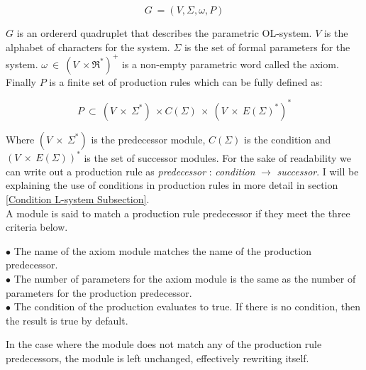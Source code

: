 \begin{flushleft}
\vspace{5mm}

\begin{equation}
G~ = (V, \Sigma, \omega, P)
\end{equation}
\vspace{5mm}

$G$ is an ordererd quadruplet that describes the parametric OL-system. $V$ is the alphabet of characters for the system. $\Sigma$ is the set of formal parameters for the system. $\omega~ \in~ (V~ \times \Re^*)^+$ is a non-empty parametric word called the axiom. Finally $P$ is a finite set of production rules which can be fully defined as:

\vspace{5mm}

\begin{equation}
P~ \subset~ (V~ \times~ \Sigma^*)~ \times C(\Sigma)~ \times~ (V~ \times~ E(\Sigma)^*)^*
\end{equation}

\vspace{5mm} 

Where $(V~ \times~ \Sigma^*) $ is the predecessor module, $C(\Sigma) $ is the condition and $(V~ \times~ E(\Sigma))^* $ is the set of successor modules. For the sake of readability we can write out a production rule as \textit{predecessor} : \textit{condition} $\rightarrow$ \textit{successor}. I will be explaining the use of conditions in production rules in more detail in section \ref{Condition L-system Subsection}.\\
A module is said to match a production rule predecessor if they meet the three criteria below.

\vspace{5mm}

$\bullet$ The name of the axiom module matches the name of the production predecessor. \\
$\bullet$ The number of parameters for the axiom module is the same as the number of parameters for the production predecessor. \\
$\bullet$ The condition of the production evaluates to true. If there is no condition, then the result is true by default.\\

\vspace{5mm}

In the case where the module does not match any of the production rule predecessors, the module is left unchanged, effectively rewriting itself. \\

\end{flushleft}

